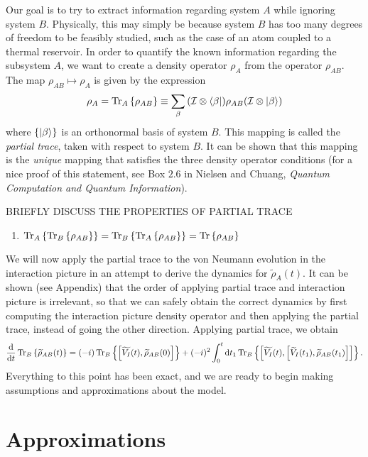 \documentclass{article}
\newcommand{\ten}{\otimes}
\newcommand{\Tra}[1]{\Tr\left\{#1\right\}}
\newcommand{\Ptra}[2]{\Tr_{#1}\left\{#2\right\}}
\newcommand{\til}[1]{\widetilde{#1}}
\newcommand{\I}{\mathcal{I}}
\begin{document}
Our goal is to try to extract information regarding system $A$ while ignoring system $B$. Physically, this may simply be because system $B$ has too many degrees of freedom to be feasibly studied, such as the case of an atom coupled to a thermal reservoir. In order to quantify the known information regarding the subsystem $A$, we want to create a density operator $\rho_A$ from the operator $\rho_{AB}$. The map $\rho_{AB}\mapsto\rho_A$ is given by the expression
\begin{equation}\label{ptra}
\rho_A = \Ptra{A}{\rho_{AB}}\equiv\sum_{\beta}\qty(\I\ten\bra{\beta})\rho_{AB}\qty(\I\ten\ket{\beta})
\end{equation}
where $\{\ket{\beta}\}$ is an orthonormal basis of system $B$. This mapping is called the \textit{partial trace}, taken with respect to system $B$. It can be shown that this mapping is the \textit{unique} mapping that satisfies the three density operator conditions (for a nice proof of this statement, see Box $2.6$ in Nielsen and Chuang, \textit{Quantum Computation and Quantum Information}).

BRIEFLY DISCUSS THE PROPERTIES OF PARTIAL TRACE
\begin{enumerate}
	\item $\Ptra{A}{\Ptra{B}{\rho_{AB}}} = \Ptra{B}{\Ptra{A}{\rho_{AB}}} = \Tra{\rho_{AB}}$
\end{enumerate}

We will now apply the partial trace to the von Neumann evolution in the interaction picture in an attempt to derive the dynamics for $\til{\rho}_A(t)$. It can be shown (see Appendix) that the order of applying partial trace and interaction picture is irrelevant, so that we can safely obtain the correct dynamics by first computing the interaction picture density operator and then applying the partial trace, instead of going the other direction. Applying partial trace, we obtain
\begin{equation}\label{partintpert}
\dv{t}\Ptra{B}{\til{\rho}_{AB}(t)} = (-i)\Ptra{B}{\comm{\til{V_I}(t)}{\til{\rho}_{AB}(0)}} + (-i)^2\int_0^{t}\dd{t_1}\Ptra{B}{\comm{\til{V_I}(t)}{\comm{\til{V}_I(t_1)}{\til{\rho}_{AB}(t_1)}}}.
\end{equation}
Everything to this point has been exact, and we are ready to begin making assumptions and approximations about the model.

\section{Approximations}
\end{document}
